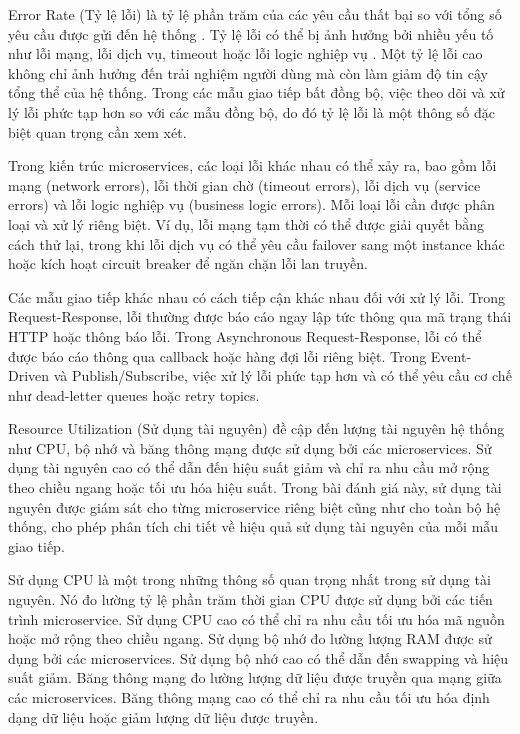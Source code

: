 Error Rate (Tỷ lệ lỗi) là tỷ lệ phần trăm của các yêu cầu thất bại so với tổng số yêu cầu được gửi đến hệ thống \cite{newman2015}. Tỷ lệ lỗi có thể bị ảnh hưởng bởi nhiều yếu tố như lỗi mạng, lỗi dịch vụ, timeout hoặc lỗi logic nghiệp vụ \cite{richardson2019}. Một tỷ lệ lỗi cao không chỉ ảnh hưởng đến trải nghiệm người dùng mà còn làm giảm độ tin cậy tổng thể của hệ thống. Trong các mẫu giao tiếp bất đồng bộ, việc theo dõi và xử lý lỗi phức tạp hơn so với các mẫu đồng bộ, do đó tỷ lệ lỗi là một thông số đặc biệt quan trọng cần xem xét.

Trong kiến trúc microservices, các loại lỗi khác nhau có thể xảy ra, bao gồm lỗi mạng (network errors), lỗi thời gian chờ (timeout errors), lỗi dịch vụ (service errors) và lỗi logic nghiệp vụ (business logic errors). Mỗi loại lỗi cần được phân loại và xử lý riêng biệt. Ví dụ, lỗi mạng tạm thời có thể được giải quyết bằng cách thử lại, trong khi lỗi dịch vụ có thể yêu cầu failover sang một instance khác hoặc kích hoạt circuit breaker để ngăn chặn lỗi lan truyền.

Các mẫu giao tiếp khác nhau có cách tiếp cận khác nhau đối với xử lý lỗi. Trong Request-Response, lỗi thường được báo cáo ngay lập tức thông qua mã trạng thái HTTP hoặc thông báo lỗi. Trong Asynchronous Request-Response, lỗi có thể được báo cáo thông qua callback hoặc hàng đợi lỗi riêng biệt. Trong Event-Driven và Publish/Subscribe, việc xử lý lỗi phức tạp hơn và có thể yêu cầu cơ chế như dead-letter queues hoặc retry topics.

Resource Utilization (Sử dụng tài nguyên) đề cập đến lượng tài nguyên hệ thống như CPU, bộ nhớ và băng thông mạng được sử dụng bởi các microservices. Sử dụng tài nguyên cao có thể dẫn đến hiệu suất giảm và chỉ ra nhu cầu mở rộng theo chiều ngang hoặc tối ưu hóa hiệu suất. Trong bài đánh giá này, sử dụng tài nguyên được giám sát cho từng microservice riêng biệt cũng như cho toàn bộ hệ thống, cho phép phân tích chi tiết về hiệu quả sử dụng tài nguyên của mỗi mẫu giao tiếp.

Sử dụng CPU là một trong những thông số quan trọng nhất trong sử dụng tài nguyên. Nó đo lường tỷ lệ phần trăm thời gian CPU được sử dụng bởi các tiến trình microservice. Sử dụng CPU cao có thể chỉ ra nhu cầu tối ưu hóa mã nguồn hoặc mở rộng theo chiều ngang. Sử dụng bộ nhớ đo lường lượng RAM được sử dụng bởi các microservices. Sử dụng bộ nhớ cao có thể dẫn đến swapping và hiệu suất giảm. Băng thông mạng đo lường lượng dữ liệu được truyền qua mạng giữa các microservices. Băng thông mạng cao có thể chỉ ra nhu cầu tối ưu hóa định dạng dữ liệu hoặc giảm lượng dữ liệu được truyền.

